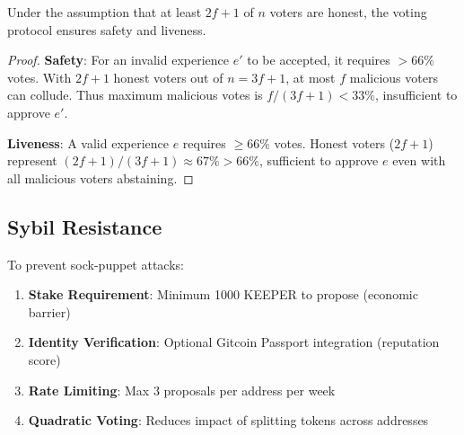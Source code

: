 \begin{theorem}
Under the assumption that at least $2f + 1$ of $n$ voters are honest, the \DAO{} voting protocol ensures safety and liveness.
\end{theorem}

\begin{proof}
\textbf{Safety}: For an invalid experience $e'$ to be accepted, it requires $> 66\%$ votes. With $2f + 1$ honest voters out of $n = 3f + 1$, at most $f$ malicious voters can collude. Thus maximum malicious votes is $f/(3f+1) < 33\%$, insufficient to approve $e'$.

\textbf{Liveness}: A valid experience $e$ requires $\geq 66\%$ votes. Honest voters ($2f+1$) represent $(2f+1)/(3f+1) \approx 67\% > 66\%$, sufficient to approve $e$ even with all malicious voters abstaining.
\end{proof}

\subsection{Sybil Resistance}

To prevent sock-puppet attacks:

\begin{enumerate}
    \item \textbf{Stake Requirement}: Minimum 1000 KEEPER to propose (economic barrier)
    \item \textbf{Identity Verification}: Optional Gitcoin Passport integration (reputation score)
    \item \textbf{Rate Limiting}: Max 3 proposals per address per week
    \item \textbf{Quadratic Voting}: Reduces impact of splitting tokens across addresses
\end{enumerate}

